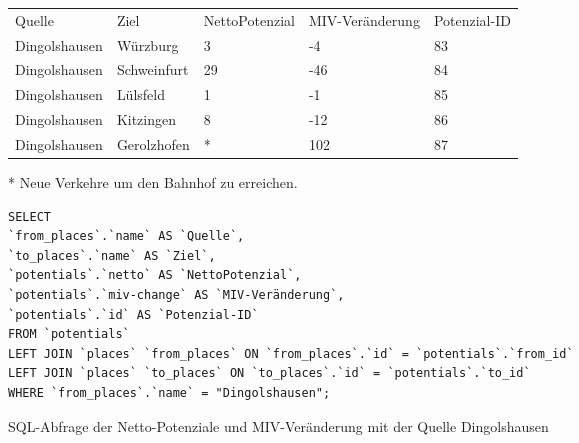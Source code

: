 \begin{tabular}{ l  l  l  l  l }
Quelle & Ziel & NettoPotenzial & MIV-Veränderung & Potenzial-ID\\ 
Dingolshausen & Würzburg & 3 & -4 & 83\\ 
Dingolshausen & Schweinfurt & 29 & -46 & 84\\ 
Dingolshausen & Lülsfeld & 1 & -1 & 85\\ 
Dingolshausen & Kitzingen & 8 & -12 & 86\\ 
Dingolshausen & Gerolzhofen & * & 102 & 87\\ 
\end{tabular}
\newline
\newline
* Neue Verkehre um den Bahnhof zu erreichen.
\newline
\begin{listing}[htbp]
\begin{verbatim}
SELECT
`from_places`.`name` AS `Quelle`, 
`to_places`.`name` AS `Ziel`, 
`potentials`.`netto` AS `NettoPotenzial`, 
`potentials`.`miv-change` AS `MIV-Veränderung`, 
`potentials`.`id` AS `Potenzial-ID`
FROM `potentials`
LEFT JOIN `places` `from_places` ON `from_places`.`id` = `potentials`.`from_id`
LEFT JOIN `places` `to_places` ON `to_places`.`id` = `potentials`.`to_id`
WHERE `from_places`.`name` = "Dingolshausen";
\end{verbatim}
\caption{SQL-Abfrage der Netto-Potenziale und MIV-Veränderung mit der Quelle Dingolshausen}\label{lst-fz-dingolhausen}
\end{listing}